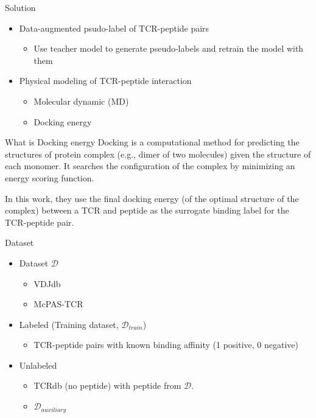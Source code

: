 \documentclass[aspectratio=1610,xcolor={dvipsnames},hyperref={colorlinks,unicode,linkcolor=violet,anchorcolor=blueviolet,citecolor=YellowOrange,filecolor=black,urlcolor=Aquamarine}]{beamer}
\begin{document}
\begin{frame}[label={sec:orgf452d1e}]{Solution}
\begin{itemize}
\item Data-augmented psudo-label of TCR-peptide pairs
\begin{itemize}
\item Use teacher model to generate pseudo-labels and retrain the model with them
\end{itemize}
\item Physical modeling of TCR-peptide interaction
\begin{itemize}
\item Molecular dynamic (MD)
\item Docking energy
\end{itemize}
\end{itemize}
\end{frame}

\begin{frame}[label={sec:orga9c8cd2}]{What is Docking energy}
Docking is a computational method for predicting the structures of
protein complex (e.g., dimer of two molecules) given the structure of
each monomer. It searches the configuration of the complex by
minimizing an energy scoring function.

In this work, they use the final docking energy (of the optimal
structure of the complex) between a TCR and peptide as the surrogate
binding label for the TCR-peptide pair.
\end{frame}

\begin{frame}[label={sec:orgba90bb2}]{Dataset}
\begin{itemize}
\item Dataset \(\mathcal{D}\)
\begin{itemize}
\item VDJdb 
\item McPAS-TCR 
\end{itemize}
\item Labeled (Training dataset, \(\mathcal{D}_{train}\))
\begin{itemize}
\item TCR-peptide pairs with known binding affinity (1 positive, 0 negative)
\end{itemize}
\item Unlabeled
\begin{itemize}
\item TCRdb (no peptide) with peptide from \(\mathcal{D}\).
\item \(\mathcal{D}_{auxiliary}\)
\end{itemize}
\end{itemize}
\end{frame}
\end{document}
